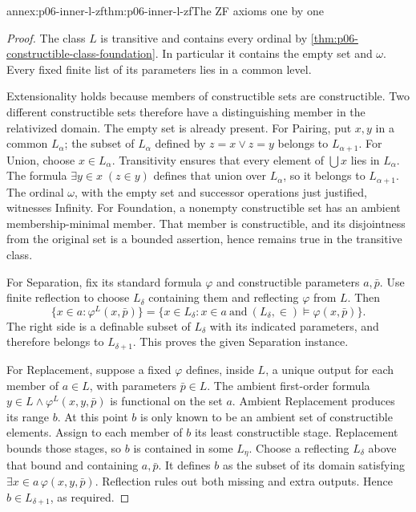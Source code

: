 \begin{annexitem}{annex:p06-inner-l-zf}{thm:p06-inner-l-zf}{The ZF axioms one by one}
\begin{proof}
The class \(L\) is transitive and contains every ordinal by
\cref{thm:p06-constructible-class-foundation}.
In particular it contains the empty set and \(\omega\).
Every fixed finite list of its parameters lies in a common level.

Extensionality holds because members of constructible sets are
constructible. Two different constructible sets therefore have a
distinguishing member in the relativized domain.
The empty set is already present.
For Pairing, put \(x,y\) in a common \(L_\alpha\);
the subset of \(L_\alpha\) defined by \(z=x\lor z=y\)
belongs to \(L_{\alpha+1}\).
For Union, choose \(x\in L_\alpha\).
Transitivity ensures that every element of \(\bigcup x\)
lies in \(L_\alpha\). The formula
\(\exists y\in x\;(z\in y)\) defines that union over
\(L_\alpha\), so it belongs to \(L_{\alpha+1}\).
The ordinal \(\omega\), with the empty set and successor
operations just justified, witnesses Infinity.
For Foundation, a nonempty constructible set has an
ambient membership-minimal member. That member is constructible,
and its disjointness from the original set is a bounded
assertion, hence remains true in the transitive class.

For Separation, fix its standard formula \(\varphi\) and
constructible parameters \(a,\bar p\).
Use finite reflection to choose \(L_\delta\) containing
them and reflecting \(\varphi\) from \(L\).
Then
\[
 \{x\in a:\varphi^L(x,\bar p)\}
 =
 \{x\in L_\delta:x\in a\ \text{and}\
           (L_\delta,\in)\models\varphi(x,\bar p)\}.
\]
The right side is a definable subset of \(L_\delta\)
with its indicated parameters, and therefore belongs to
\(L_{\delta+1}\). This proves the given Separation instance.

For Replacement, suppose a fixed \(\varphi\) defines,
inside \(L\), a unique output for each member of
\(a\in L\), with parameters \(\bar p\in L\).
The ambient first-order formula
\(y\in L\land\varphi^L(x,y,\bar p)\) is functional on
the set \(a\).
Ambient Replacement produces its range \(b\).
At this point \(b\) is only known to be an ambient set
of constructible elements.
Assign to each member of \(b\) its least constructible
stage. Replacement bounds those stages, so \(b\) is
contained in some \(L_\eta\).
Choose a reflecting \(L_\delta\) above that bound and
containing \(a,\bar p\).
It defines \(b\) as the subset of its domain satisfying
\(\exists x\in a\,\varphi(x,y,\bar p)\).
Reflection rules out both missing and extra outputs.
Hence \(b\in L_{\delta+1}\), as required.


\end{proof}
\end{annexitem}
